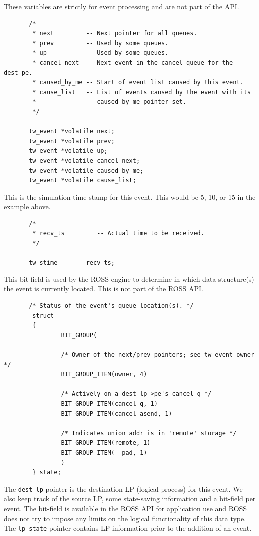 \documentclass[12pt]{article}
\begin{document}
These variables are strictly for event processing and are not part of
the API.

\begin{verbatim}
       /*
        * next         -- Next pointer for all queues.
        * prev         -- Used by some queues.
        * up           -- Used by some queues.
        * cancel_next  -- Next event in the cancel queue for the dest_pe.
        * caused_by_me -- Start of event list caused by this event.
        * cause_list   -- List of events caused by the event with its
        *                 caused_by_me pointer set.
        */

       tw_event *volatile next;
       tw_event *volatile prev;
       tw_event *volatile up;
       tw_event *volatile cancel_next;
       tw_event *volatile caused_by_me;
       tw_event *volatile cause_list;
\end{verbatim}

This is the simulation time stamp for this event.  This would be 5,
10, or 15 in the example above.

\begin{verbatim}
       /*
        * recv_ts         -- Actual time to be received.     
        */

       tw_stime        recv_ts;
\end{verbatim}

This bit-field is used by the ROSS engine to determine in which data
structure(s) the event is currently located.  This is not part of the
ROSS API.

\begin{verbatim}
       /* Status of the event's queue location(s). */
        struct
        {
                BIT_GROUP(

                /* Owner of the next/prev pointers; see tw_event_owner */
                BIT_GROUP_ITEM(owner, 4)

                /* Actively on a dest_lp->pe's cancel_q */
                BIT_GROUP_ITEM(cancel_q, 1)
                BIT_GROUP_ITEM(cancel_asend, 1)

                /* Indicates union addr is in 'remote' storage */
                BIT_GROUP_ITEM(remote, 1)
                BIT_GROUP_ITEM(__pad, 1)
                )
        } state;
\end{verbatim}

The {\tt dest\_lp} pointer is the destination LP (logical process) for this
event.  We also keep track of the source LP, some state-saving information and
a bit-field per event.  The bit-field is available in the ROSS API for
application use and ROSS does not try to impose any limits on the logical
functionality of this data type.  The {\tt lp\_state} pointer contains LP
information prior to the addition of an event.
\end{document}
